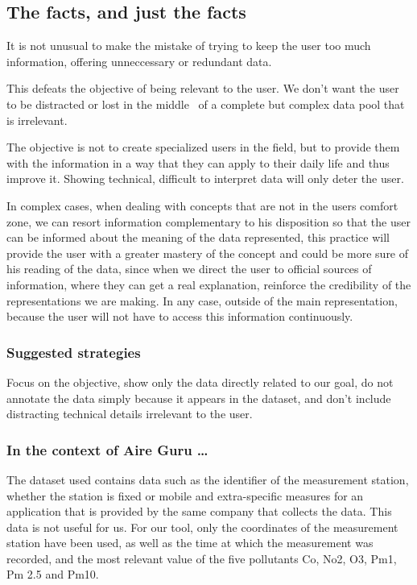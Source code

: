 \subsection{The facts, and just the facts}

It is not unusual to make the mistake of trying to keep the user too much information, offering unneccessary or redundant data.
 
This defeats the objective of being relevant to the user. We don't want the user to be distracted or lost in the middle
 of a complete but complex data pool that is irrelevant.

The objective is not to create specialized users in the field, but to provide them with the
information in a way that they can apply to their daily life and thus improve it. Showing
technical, difficult to interpret data will only deter the user. 

In complex cases, when dealing with concepts that are not in the users comfort zone, we can resort information
complementary to his disposition so that the user can be informed about the meaning of the data
represented, this practice will provide the user with a greater mastery of the concept and could be more
sure of his reading of the data, since when we direct the user to official sources of information, where they can
get a real explanation, reinforce the credibility of the representations we are making. In any case,
outside of the main representation, because the user will not have to access this information continuously.

\subsubsection*{Suggested strategies}

Focus on the objective, show only the data directly related to our goal, do not annotate the data
simply because it appears in the dataset, and don't include distracting technical details irrelevant to the user.

\subsubsection*{In the context of Aire Guru \ldots} 

The dataset used contains data such as the identifier of the measurement station, whether the station is fixed or mobile
and extra-specific measures for an application that is provided by the same company that collects the data. This data is not useful for us.
For our tool, only the coordinates of the measurement station have been used, as well as the time at which the measurement was recorded, and the most relevant value of the five pollutants Co, No2, O3, Pm1, Pm 2.5 and Pm10.

